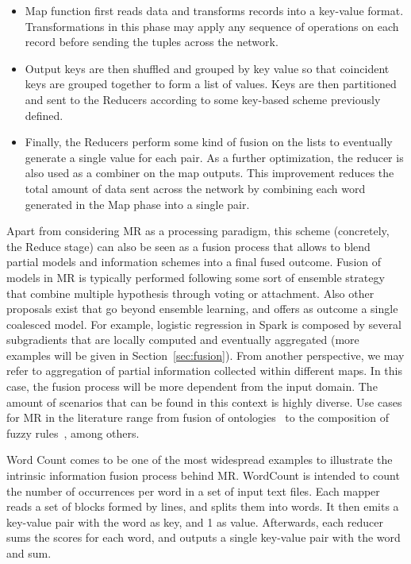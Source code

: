 \documentclass[3p,review]{elsarticle}
\begin{document}
	\begin{itemize}
		\item Map function first reads data and transforms records into a key-value format. Transformations in this phase may apply any sequence of operations on each record before sending the tuples across the network. 
		\item Output keys are then shuffled and grouped by key value so that coincident keys are grouped together to form a list of values. Keys are then partitioned and sent to the Reducers according to some key-based scheme previously defined. 
		\item Finally, the Reducers perform some kind of fusion on the lists to eventually generate a single value for each pair. As a further optimization, the reducer is also used as a combiner on the map outputs. This improvement reduces the total amount of data sent across the network by combining each word generated in the Map phase into a single pair.
	\end{itemize}
	
	
	Apart from considering MR as a processing paradigm, this scheme (concretely, the Reduce stage) can also be seen as a fusion process that allows to blend partial models and information schemes into a final fused outcome. Fusion of models in MR is typically performed following some sort of ensemble strategy that combine multiple hypothesis through voting or attachment. Also other proposals exist that go beyond ensemble learning, and offers as outcome a single coalesced model. For example, logistic regression in Spark is composed by several subgradients that are locally computed and eventually aggregated (more examples will be given in Section~\ref{sec:fusion}). From another perspective, we may refer to aggregation of partial information collected within different maps. In this case, the fusion process will be more dependent from the input domain. The amount of scenarios that can be found in this context is highly diverse. Use cases for MR in the literature range from fusion of ontologies~\cite{zhang14b} to the composition of fuzzy rules~\cite{rio15b}, among others.
	
	Word Count comes to be one of the most widespread examples to illustrate the intrinsic information fusion process behind MR. WordCount is intended to count the number of occurrences per word in a set of input text files. Each mapper reads a set of blocks formed by lines, and splits them into words. It then emits a key-value pair with the word as key, and 1 as value. Afterwards, each reducer sums the scores for each word, and outputs a single key-value pair with the word and sum. 
	
\end{document}
